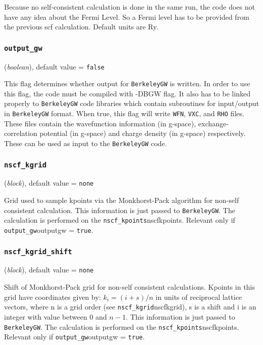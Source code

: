 \documentclass{article}
\begin{document}
Because no self-consistent calculation is done in the same run, the code 
does not have any idea about the Fermi Level. So a Fermi level has to be 
provided from the previous scf calculation. Default units are Ry.

\subsubsection{\tt output\_gw
\label{outputgw}}
({\it boolean}),
default value = {\tt false }

This flag determines whether output for {\tt BerkeleyGW} is written. In
order to use this flag, the code must be compiled with {-DBGW} flag. It 
also has to be linked properly to {\tt BerkeleyGW} code libraries which
contain subroutines for input/output in {\tt BerkeleyGW} format. When true,
this flag will write {\tt WFN}, {\tt VXC}, and {\tt RHO} files. These 
files contain the wavefunction information (in g-space), exchange-correlation
potential (in g-space) and charge density (in g-space) respectively. These
can be used as input to the {\tt BerkeleyGW} code.

\subsubsection{\tt nscf\_kgrid
\label{nscfkgrid}}
({\it block}),
default value = {\tt none }

Grid used to sample kpoints via the Monkhorst-Pack algorithm for non-self 
consistent calculation. This information is just passed to {\tt BerkeleyGW}. 
The calculation is performed on the {\tt nscf\_kpoints}{nscfkpoints}. 
Relevant only if  {\tt output\_gw}{outputgw} = {\tt true}.

\subsubsection{\tt nscf\_kgrid\_shift
\label{nscfkgridshift}}
({\it block}),
default value = {\tt none }

Shift of Monkhorst-Pack grid for non-self consistent calculations. 
Kpoints in this grid have coordinates given by: $k_i = ( i + s )/n$ 
in units of reciprocal lattice vectors, where n is a grid order 
(see {\tt nscf\_kgrid}{nscfkgrid}), s is a shift and i is an 
integer with value between 0 and $n-1$. This information is just passed 
to {\tt BerkeleyGW}. The calculation is performed on the 
{\tt nscf\_kpoints}{nscfkpoints}. Relevant only if 
{\tt output\_gw}{outputgw} = {\tt true}.
\end{document}
